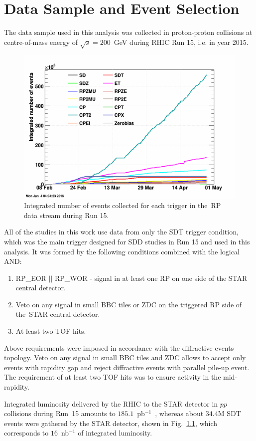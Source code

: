 \chapter{Data Sample and Event Selection}\label{section:star_data_sample}\label{section:star_trigger_selection}
The data sample used in this analysis was collected in proton-proton collisions at centre-of-mass energy of $\sqrt{s}=200$~GeV during RHIC Run 15, i.e. in year 2015. %

\begin{figure}[h!]
	\centering
	\includegraphics[width=.6\textwidth]{chapters/dataSampleSTAR/img/nEvents.png}
	\caption{Integrated number of events collected for each trigger in the~\ac{RP} data stream during Run 15. }
	\label{fig:lumiRHIC}
\end{figure}

All of the studies in this work use data from only the SDT trigger condition, which was the main trigger designed for SDD studies in Run 15 and used in this analysis. It was formed by the following conditions combined with the logical AND:
\begin{enumerate}
	\item RP\_EOR $||$ RP\_WOR - signal in at least one RP on one side of the STAR central detector.
	\item Veto on any signal in small BBC tiles or ZDC on the triggered RP  side of the~STAR central detector.
	\item At least two TOF hits.
\end{enumerate}
Above requirements were imposed in accordance with the diffractive events topology. Veto on any signal in small BBC tiles and ZDC allows to accept only events with rapidity gap and reject diffractive events with parallel pile-up event. The requirement of at least two TOF hits was to ensure activity in the mid-rapidity.

Integrated luminosity delivered by the RHIC to the STAR detector in $pp$ collisions during Run~15 amounts to $185.1$~pb$^{-1}$~\cite{RHIC:rhicRunLuminosity}, whereas about $34.4$M SDT events were gathered by the STAR detector, shown in Fig.~\ref{fig:lumiRHIC}, which corresponds to $16$~nb$^{-1}$ of integrated luminosity.
